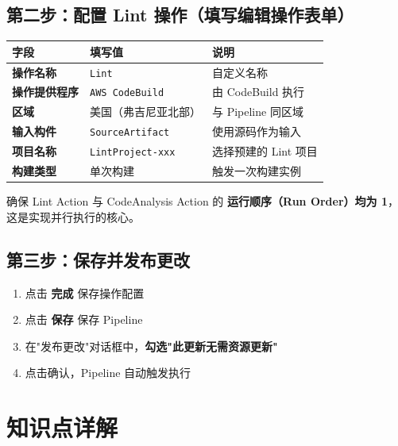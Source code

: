 \documentclass[12pt, a4paper]{article}
\begin{document}
\subsection{第二步：配置 Lint 操作（填写编辑操作表单）}

\begin{center}
\begin{tabular}{>{\bfseries}p{3.5cm} p{5cm} p{5cm}}
    \toprule
    字段 & 填写值 & 说明 \\
    \midrule
    操作名称 & \texttt{Lint} & 自定义名称 \\
    操作提供程序 & \texttt{AWS CodeBuild} & 由 CodeBuild 执行 \\
    区域 & 美国（弗吉尼亚北部） & 与 Pipeline 同区域 \\
    输入构件 & \texttt{SourceArtifact} & 使用源码作为输入 \\
    项目名称 & \texttt{LintProject-xxx} & 选择预建的 Lint 项目 \\
    构建类型 & 单次构建 & 触发一次构建实例 \\
    \bottomrule
\end{tabular}
\end{center}

\begin{warnbox}[title=关键配置]
    确保 Lint Action 与 CodeAnalysis Action 的 \textbf{运行顺序（Run Order）均为 1}，这是实现并行执行的核心。
\end{warnbox}

\subsection{第三步：保存并发布更改}

\begin{enumerate}[leftmargin=2em]
    \item 点击 \textbf{完成} 保存操作配置
    \item 点击 \textbf{保存} 保存 Pipeline
    \item 在"发布更改"对话框中，\textbf{勾选"此更新无需资源更新"}
    \item 点击确认，Pipeline 自动触发执行
\end{enumerate}

\section{知识点详解}
\end{document}
